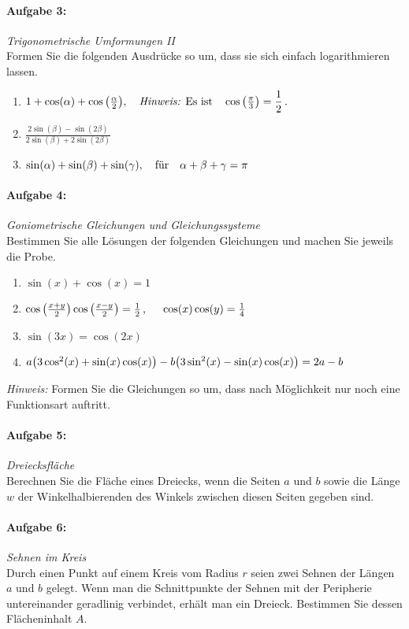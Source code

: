 \paragraph{Aufgabe 3: } \emph{Trigonometrische Umformungen II}\\[0.2cm]
Formen Sie die folgenden Ausdrücke so um, dass sie sich einfach logarithmieren lassen.\\[-1.3em]

\begin{enumerate}[label=(\alph*)]
    \item $1+\cos(\alpha) + \cos\qty(\frac{\alpha}{2}), \qq{\emph{Hinweis:} Es ist} \cos\qty(\frac{\pi}{3})=\dfrac{1}{2}\,.$
    \item $\frac{2\sin(\beta) - \sin (2\beta)}{2\sin(\beta)+2\sin(2\beta)}$
    \item $\sin(\alpha)+\sin(\beta)+\sin(\gamma), \qq{für} \alpha+\beta+\gamma = \pi$
\end{enumerate}
%
\paragraph{Aufgabe 4: } \emph{Goniometrische Gleichungen und Gleichungssysteme}\\[0.2cm]
Bestimmen Sie alle Lösungen der folgenden Gleichungen und machen Sie jeweils die Probe.
\begin{enumerate}[label=(\alph*)]
    \item $\sin(x)+\cos(x)= 1$
    \item $\cos\qty(\frac{x+y}{2})\cos\qty(\frac{x-y}{2})=\frac{1}{2}\,, \hspace{0.5cm}\cos(x)\cos(y)=\frac{1}{4}$
    \item $\sin(3x)=\cos(2x)$
    \item $a\qty(3\cos^2(x)+\sin(x)\cos(x))-b\qty(3\sin^2(x)-\sin(x)\cos(x))=2a-b$
\end{enumerate}
\emph{Hinweis:} Formen Sie die Gleichungen so um, dass nach Möglichkeit  nur noch eine Funktionsart auftritt.
%
\paragraph{Aufgabe 5: } \emph{Dreiecksfläche}\\[0.2cm]
Berechnen Sie die Fläche eines Dreiecks, wenn die Seiten $a$ und $b$ sowie die Länge $w$ der Winkelhalbierenden des Winkels zwischen diesen Seiten gegeben sind.
%
\paragraph{Aufgabe 6: } \emph{Sehnen im Kreis}\\[0.2cm]
Durch einen Punkt auf einem Kreis vom Radius $r$ seien zwei Sehnen der Längen $a$ und $b$ gelegt. Wenn man die Schnittpunkte der Sehnen mit der Peripherie untereinander geradlinig verbindet, erhält man ein Dreieck. Bestimmen Sie dessen Flächeninhalt $A$.

